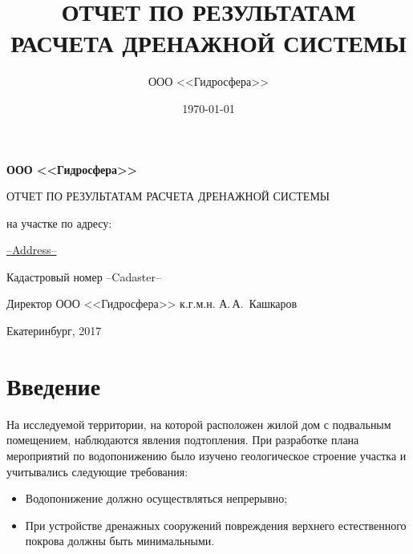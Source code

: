 \documentclass[a4paper,12pt]{article} %
\author{ООО <<Гидросфера>>}\label{company}
\title{ОТЧЕТ ПО РЕЗУЛЬТАТАМ РАСЧЕТА ДРЕНАЖНОЙ СИСТЕМЫ}
\date{\today}
\newcommand{\txtExecutor}{ООО <<Гидросфера>>}	%
\newcommand{\txtYear}{2017}						%
\newcommand{\txtAddress}{--Address--}			%
\newcommand{\txtCadaster}{--Cadaster--} 		%
\begin{document}

\setlength{\extrarowheight}{1mm} %


\begin{titlepage}
	\begin{center}
		\textbf{\txtExecutor}
		\vspace{5.5cm}
		
		{\LARGE ОТЧЕТ ПО РЕЗУЛЬТАТАМ РАСЧЕТА ДРЕНАЖНОЙ СИСТЕМЫ}
		\vspace{0.25cm}
		
		\bigskip
		
		на участке по адресу:
				
		\underline{\txtAddress}
		
		\bigskip
		Кадастровый номер \txtCadaster
		
		\vfill
	
		\bigskip
		
	\end{center}

	\vfill
	
	\newlength{\ML}
	\hfill
	\begin{minipage}{1.0\textwidth}
		Директор ООО <<Гидросфера>> к.г.м.н.
		\underline{\hspace{\ML}} А.\,А.~Кашкаров\\
	\end{minipage}%
	
	\bigskip
	
	\vfill
	\begin{center}
		Екатеринбург, \txtYear
	\end{center}			

	\end{titlepage}


\section{Введение}

На исследуемой территории, на которой расположен жилой дом с подвальным помещением, наблюдаются явления подтопления. При разработке плана мероприятий по водопонижению было изучено геологическое строение участка и учитывались следующие требования:
\begin{itemize}
\item Водопонижение должно осуществляться непрерывно;
\item При устройстве дренажных сооружений повреждения верхнего естественного покрова должны быть минимальными.
\end{itemize}
\end{document}
